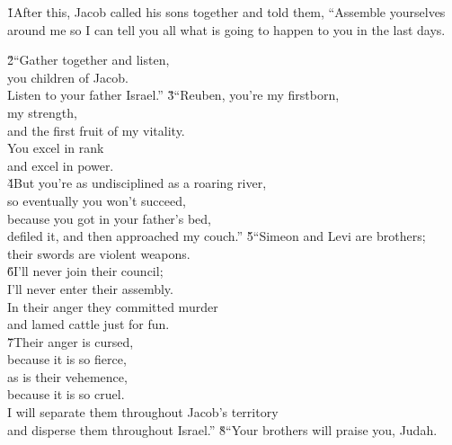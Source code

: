 \v{1}After this, Jacob called his sons together and told them, ``Assemble yourselves around me so I can tell you all what is going to happen to you in the last days.

\begin{poetry}
\poeml \v{2}``Gather together and listen, \\
\poemll    you children of Jacob. \\
\poemlll       Listen to your father Israel.''
\poeml \v{3}``Reuben, you're my firstborn, \\
\poemll    my strength, \\
\poemlll       and the first fruit of my vitality. \\
\poeml You excel in rank \\
\poemll    and excel in power. \\
\poeml \v{4}But you're as undisciplined as a roaring river, \\
\poemll    so eventually you won't succeed, \\
\poeml because you got in your father's bed, \\
\poemll    defiled it, and then approached my couch.''
\poeml \v{5}``Simeon and Levi are brothers; \\
\poemll    their swords are violent weapons. \\
\poeml \v{6}I'll never join their council; \\
\poemll    I'll never enter their assembly. \\
\poeml In their anger they committed murder \\
\poemll    and lamed cattle just for fun. \\
\poeml \v{7}Their anger is cursed, \\
\poemll    because it is so fierce, \\
\poeml as is their vehemence, \\
\poemll    because it is so cruel. \\
\poeml I will separate them throughout Jacob's territory \\
\poemll    and disperse them throughout Israel.''
\poeml \v{8}``Your brothers will praise you, Judah. \\

\end{poetry}
